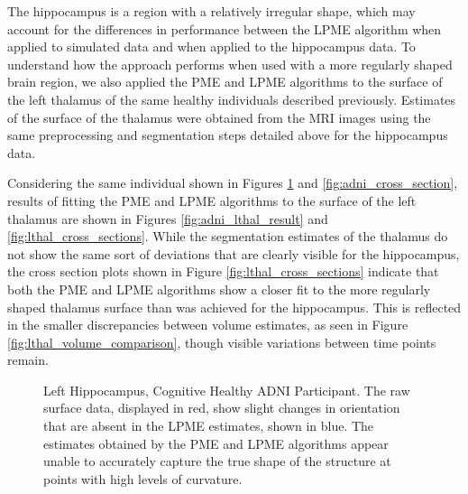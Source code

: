 \documentclass[11pt,reqno]{article}
\newcommand{\zielinski}[1]{{\color{blue} \sf $\spadesuit\spadesuit\spadesuit$ Rob Zielinski: [#1]}}
\theoremstyle{definition}
\begin{document}
The hippocampus is a region with a relatively irregular shape, which may account for the differences in performance between the LPME algorithm when applied to simulated data and when applied to the hippocampus data. To understand how the approach performs when used with a more regularly shaped brain region, we also applied the PME and LPME algorithms to the surface of the left thalamus of the same healthy individuals described previously. Estimates of the surface of the thalamus were obtained from the MRI images using the same preprocessing and segmentation steps detailed above for the hippocampus data.

Considering the same individual shown in Figures \ref{fig:adni_result} and \ref{fig:adni_cross_section}, results of fitting the PME and LPME algorithms to the surface of the left thalamus are shown in Figures \ref{fig:adni_lthal_result} and \ref{fig:lthal_cross_sections}. While the segmentation estimates of the thalamus do not show the same sort of deviations that are clearly visible for the hippocampus, the cross section plots shown in Figure \ref{fig:lthal_cross_sections} indicate that both the PME and LPME algorithms show a closer fit to the more regularly shaped thalamus surface than was achieved for the hippocampus. This is reflected in the smaller discrepancies between volume estimates, as seen in Figure \ref{fig:lthal_volume_comparison}, though visible variations between time points remain.

\begin{figure}%
  \centering
  \hfill
  \hfill

  \caption{Left Hippocampus, Cognitive Healthy ADNI Participant. The raw surface data, displayed in red, show slight changes in orientation that are absent in the LPME estimates, shown in blue. The estimates obtained by the PME and LPME algorithms appear unable to accurately capture the true shape of the structure at points with high levels of curvature.}
  \label{fig:adni_result}
\end{figure}



\end{document}
